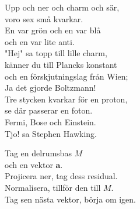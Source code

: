 \documentclass[a6paper, 10pt, twoside]{article}
\begin{document}
\noindent
\begin{center}
\end{center}
\begin{lyrics}
Upp och ner och charm och sär, \\
voro sex små kvarkar. \\
En var grön och en var blå \\
och en var lite anti. 
\vspace{5pt} \\
"Hej" sa topp till lille charm, \\
känner du till Plancks konstant \\
och en förskjutningslag från Wien; \\
Ja det gjorde Boltzmann! 
\vspace{5pt} \\
Tre stycken kvarkar för en proton, \\
se där passerar en foton. \\
Fermi, Bose och Einstein. \\
Tjo! sa Stephen Hawking. 
\end{lyrics}
\begin{center}
\end{center}
\begin{lyrics}
Tag en delrumsbas $M$\\
och en vektor $\boldsymbol{a}$.\\
Projicera ner, tag dess residual.\\
Normalisera, tillför den till $M$.\\
Tag sen nästa vektor, börja om igen.
\end{lyrics}



\noindent
\end{document}
